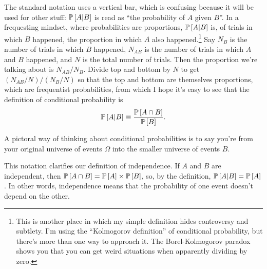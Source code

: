 The standard notation uses a vertical bar, which is confusing because it will
be used for other stuff: $\mathbb{P}\left[{A | B}\right]$ is read as ``the probability of $A$
given $B$''. In a frequesting mindset, where probabilities are proportions,
$\mathbb{P}\left[{A | B}\right]$ is, of trials in which $B$ happened, the proportion in which
$A$ also happened.\footnote{This is another place in which my simple
definition hides controversy and subtlety. I'm using the ``Kolmogorov
definition'' of conditional probability, but there's more than one way to
approach it. The Borel-Kolmogorov paradox shows you that you can get weird
situations when apparently dividing by zero.} Say $N_B$ is the number of
trials in which $B$ happened, $N_{AB}$ is the number of trials in which $A$
and $B$ happened, and $N$ is the total number of trials. Then the proportion
we're talking about is $N_{AB} / N_B$. Divide top and bottom by $N$ to get
$(N_{AB}/N) / (N_B/N)$ so that the top and bottom are themselves proportions,
which are frequentist probabilities, from which I hope it's easy to see that
the definition of conditional probability is
$$
\mathbb{P}\left[{A | B}\right] \equiv \frac{\mathbb{P}\left[{A \cap B}\right]}{\mathbb{P}\left[{B}\right]}.
$$

A pictoral way of thinking about conditional probabilities is to say you're
from your original universe of events $\Omega$ into the smaller universe of
events $B$.

This notation clarifies our definition of independence. If $A$ and $B$ are
independent, then $\mathbb{P}\left[{A \cap B}\right] = \mathbb{P}\left[{A}\right] \times \mathbb{P}\left[{B}\right]$, so, by the
definition, $\mathbb{P}\left[{A | B}\right] = \mathbb{P}\left[{A}\right]$. In other words, independence means that
the probability of one event doesn't depend on the other.